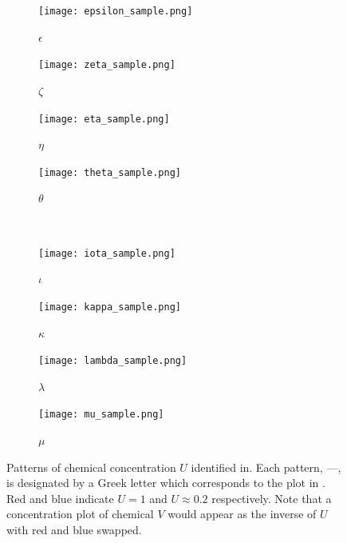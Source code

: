\begin{figure}[h]
         \begin{subfigure}[b]{0.2\textwidth}
                \texttt{[image: epsilon\_sample.png]}
                \caption{$\epsilon$}
                \label{fig:epsilon_sample}
        \end{subfigure}
        \begin{subfigure}[b]{0.2\textwidth}
                \texttt{[image: zeta\_sample.png]}
                \caption{$\zeta$}
                \label{fig:zeta_sample}
        \end{subfigure}
        \begin{subfigure}[b]{0.2\textwidth}
                \texttt{[image: eta\_sample.png]}
                \caption{$\eta$}
                \label{fig:eta_sample}
        \end{subfigure}
        \begin{subfigure}[b]{0.2\textwidth}
                \texttt{[image: theta\_sample.png]}
                \caption{$\theta$}
                \label{fig:theta_sample}
        \end{subfigure} \hfill \\
        \begin{subfigure}[b]{0.2\textwidth}
                \texttt{[image: iota\_sample.png]}
                \caption{$\iota$}
                \label{fig:iota_sample}
        \end{subfigure}
         \begin{subfigure}[b]{0.2\textwidth}
                \texttt{[image: kappa\_sample.png]}
                \caption{$\kappa$}
                \label{fig:kappa_sample}
        \end{subfigure}
        \begin{subfigure}[b]{0.2\textwidth}
                \texttt{[image: lambda\_sample.png]}
                \caption{$\lambda$}
                \label{fig:lambda_sample}
        \end{subfigure}
        \begin{subfigure}[b]{0.2\textwidth}
                \texttt{[image: mu\_sample.png]}
                \caption{$\mu$}
                \label{fig:mu_sample}
        \end{subfigure} \hfill
        \caption{Patterns of chemical concentration $U$ identified in. Each pattern, ---, is designated by a Greek letter which corresponds to the plot in . Red and blue indicate $U=1$ and $U\approx 0.2$ respectively. Note that a concentration plot of chemical $V$ would appear as the inverse of $U$ with red and blue swapped.}\label{fig:pearson}
\end{figure}

